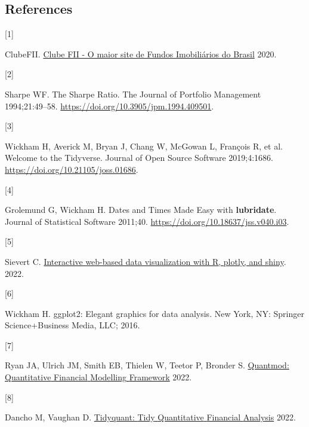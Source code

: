 \documentclass[
]{article}
\newlength{\cslhangindent}
\newlength{\csllabelwidth}
\newlength{\cslentryspacingunit} %
\newenvironment{CSLReferences}[2] %
 {%
  \setlength{\parindent}{0pt}
  \ifodd #1
  \let\oldpar\par
  \def\par{\hangindent=\cslhangindent\oldpar}
  \fi
  \setlength{\parskip}{#2\cslentryspacingunit}
 }%
 {}
\newcommand{\CSLLeftMargin}[1]{\parbox[t]{\csllabelwidth}{#1}}
\newcommand{\CSLRightInline}[1]{\parbox[t]{\linewidth - \csllabelwidth}{#1}\break}
\begin{document}
\hypertarget{references}{%
\subsection*{References}\label{references}}

\hypertarget{refs}{}
\begin{CSLReferences}{0}{0}
\leavevmode{}%
\CSLLeftMargin{{[}1{]} }%
\CSLRightInline{ClubeFII. \href{https://www.clubefii.com.br}{Clube FII -
O maior site de Fundos Imobiliários do Brasil} 2020.}

\leavevmode{}%
\CSLLeftMargin{{[}2{]} }%
\CSLRightInline{Sharpe WF. The Sharpe Ratio. The Journal of Portfolio
Management 1994;21:49--58.
\url{https://doi.org/10.3905/jpm.1994.409501}.}

\leavevmode{}%
\CSLLeftMargin{{[}3{]} }%
\CSLRightInline{Wickham H, Averick M, Bryan J, Chang W, McGowan L,
François R, et al. Welcome to the {Tidyverse}. Journal of Open Source
Software 2019;4:1686. \url{https://doi.org/10.21105/joss.01686}.}

\leavevmode{}%
\CSLLeftMargin{{[}4{]} }%
\CSLRightInline{Grolemund G, Wickham H. Dates and {Times} {Made} {Easy}
with \textbf{lubridate}. Journal of Statistical Software 2011;40.
\url{https://doi.org/10.18637/jss.v040.i03}.}

\leavevmode{}%
\CSLLeftMargin{{[}5{]} }%
\CSLRightInline{Sievert C. \href{https://plotly-r.com/}{Interactive
web-based data visualization with {R}, plotly, and shiny}. 2022.}

\leavevmode{}%
\CSLLeftMargin{{[}6{]} }%
\CSLRightInline{Wickham H. ggplot2: Elegant graphics for data analysis.
New York, NY: Springer Science+Business Media, LLC; 2016.}

\leavevmode{}%
\CSLLeftMargin{{[}7{]} }%
\CSLRightInline{Ryan JA, Ulrich JM, Smith EB, Thielen W, Teetor P,
Bronder S. \href{https://CRAN.R-project.org/package=quantmod}{Quantmod:
{Quantitative} {Financial} {Modelling} {Framework}} 2022.}

\leavevmode{}%
\CSLLeftMargin{{[}8{]} }%
\CSLRightInline{Dancho M, Vaughan D.
\href{https://CRAN.R-project.org/package=tidyquant}{Tidyquant: {Tidy}
{Quantitative} {Financial} {Analysis}} 2022.}


\end{CSLReferences}
\end{document}
